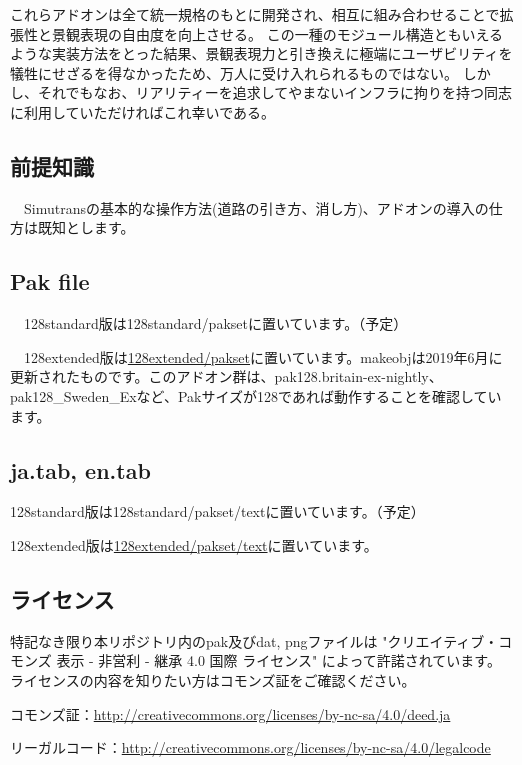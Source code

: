 \documentclass{jbook}
\begin{document}
これらアドオンは全て統一規格のもとに開発され、相互に組み合わせることで拡張性と景観表現の自由度を向上させる。
この一種のモジュール構造ともいえるような実装方法をとった結果、景観表現力と引き換えに極端にユーザビリティを犠牲にせざるを得なかったため、万人に受け入れられるものではない。
しかし、それでもなお、リアリティーを追求してやまないインフラに拘りを持つ同志に利用していただければこれ幸いである。

\subsection*{前提知識}
　Simutransの基本的な操作方法(道路の引き方、消し方)、アドオンの導入の仕方は既知とします。

\subsection*{Pak file}
　128standard版は128standard/paksetに置いています。（予定）

　128extended版は\href{https://github.com/anoKTOK/Yokubari_roads_set_ver_anoKTOK/tree/main/128extended/pakset}{128extended/pakset}に置いています。makeobjは2019年6月に更新されたものです。このアドオン群は、pak128.britain-ex-nightly、pak128{\_}Sweden{\_}Exなど、Pakサイズが128であれば動作することを確認しています。

\subsection*{ja.tab, en.tab}
128standard版は128standard/pakset/textに置いています。（予定）

128extended版は\href{https://github.com/anoKTOK/Yokubari_roads_set_ver_anoKTOK/tree/main/128extended/pakset/text}{128extended/pakset/text}に置いています。


\subsection*{ライセンス}
特記なき限り本リポジトリ内のpak及びdat, pngファイルは
"クリエイティブ・コモンズ 表示 - 非営利 - 継承 4.0 国際 ライセンス"
によって許諾されています。ライセンスの内容を知りたい方はコモンズ証をご確認ください。

コモンズ証：\href{http://creativecommons.org/licenses/by-nc-sa/4.0/deed.ja}{http://creativecommons.org/licenses/by-nc-sa/4.0/deed.ja}

リーガルコード：\href{http://creativecommons.org/licenses/by-nc-sa/4.0/legalcode}{http://creativecommons.org/licenses/by-nc-sa/4.0/legalcode}
\end{document}
